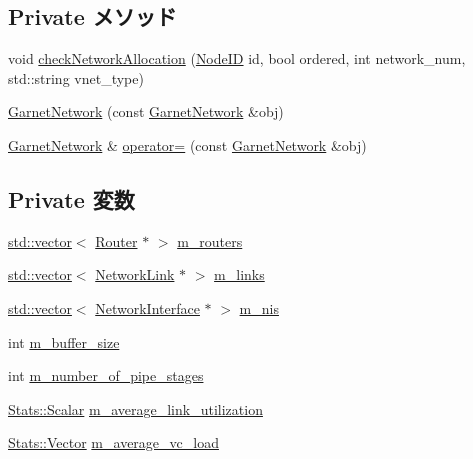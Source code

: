 \subsection*{Private メソッド}
\begin{DoxyCompactItemize}
\item 
void \hyperlink{classGarnetNetwork_ad98444c4b69e4656dd10dc4ea3ad80dd}{checkNetworkAllocation} (\hyperlink{TypeDefines_8hh_a83c14b4ae37e80071f6b3506a6c46151}{NodeID} id, bool ordered, int network\_\-num, std::string vnet\_\-type)
\item 
\hyperlink{classGarnetNetwork_a6b14a1eb693d56b628d002eb6643696f}{GarnetNetwork} (const \hyperlink{classGarnetNetwork_1_1GarnetNetwork}{GarnetNetwork} \&obj)
\item 
\hyperlink{classGarnetNetwork_1_1GarnetNetwork}{GarnetNetwork} \& \hyperlink{classGarnetNetwork_aa695f7973be23b993579769c443d1962}{operator=} (const \hyperlink{classGarnetNetwork_1_1GarnetNetwork}{GarnetNetwork} \&obj)
\end{DoxyCompactItemize}
\subsection*{Private 変数}
\begin{DoxyCompactItemize}
\item 
\hyperlink{classstd_1_1vector}{std::vector}$<$ \hyperlink{classRouter}{Router} $\ast$ $>$ \hyperlink{classGarnetNetwork_a89e3f8204cf8e9f8dfe5100275b39dcc}{m\_\-routers}
\item 
\hyperlink{classstd_1_1vector}{std::vector}$<$ \hyperlink{classNetworkLink}{NetworkLink} $\ast$ $>$ \hyperlink{classGarnetNetwork_a137ed8be2887f373fef072c3f42dd38f}{m\_\-links}
\item 
\hyperlink{classstd_1_1vector}{std::vector}$<$ \hyperlink{classNetworkInterface}{NetworkInterface} $\ast$ $>$ \hyperlink{classGarnetNetwork_aa0db2f56c97d7327e323d4ac12576479}{m\_\-nis}
\item 
int \hyperlink{classGarnetNetwork_ad58a86eb05a281840a92bb3d04adb9b1}{m\_\-buffer\_\-size}
\item 
int \hyperlink{classGarnetNetwork_ad890245efea87e148c209ff848c683a4}{m\_\-number\_\-of\_\-pipe\_\-stages}
\item 
\hyperlink{classStats_1_1Scalar}{Stats::Scalar} \hyperlink{classGarnetNetwork_a980fb21ae994fd27b0f9a935aa21edee}{m\_\-average\_\-link\_\-utilization}
\item 
\hyperlink{classStats_1_1Vector}{Stats::Vector} \hyperlink{classGarnetNetwork_aeaf247f4cb25e8bbafa5d0e629e6be10}{m\_\-average\_\-vc\_\-load}
\end{DoxyCompactItemize}


